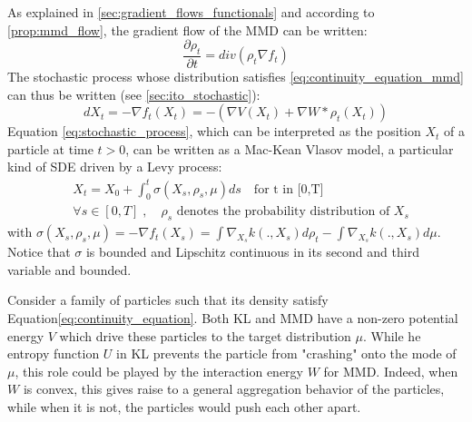 As explained in \cref{sec:gradient_flows_functionals} and according to \cref{prop:mmd_flow}, the gradient flow of the MMD can be written:
\begin{equation}\label{eq:continuity_equation_mmd}
\frac{\partial \rho_t}{\partial t}= div(\rho_t  \nabla f_t)
\end{equation}
The stochastic process whose distribution satisfies \eqref{eq:continuity_equation_mmd} can thus be written (see \cref{sec:ito_stochastic}):
\begin{equation}\label{eq:stochastic_process}
dX_t=-\nabla f_t(X_t) = - (\nabla V (X_t) + \nabla W * \rho_t(X_t))
\end{equation}
 Equation \eqref{eq:stochastic_process}, which can be interpreted as the position $X_t$ of a particle at time $t > 0$, can be written as a Mac-Kean Vlasov model, a particular kind of SDE driven by a Levy process:
\begin{align}\label{eq:theoretical_process}
&X_t=X_{0}+\int_{0}^t \sigma(X_s, \rho_s, \mu)ds \quad \text{for t in [0,T]}\\
&\forall s \in [0,T]\;,\quad \rho_s \text{ denotes the probability distribution of } X_s
\end{align}
with $\sigma(X_s, \rho_s, \mu)=-\nabla f_t(X_s)=\int \nabla_{X_s}k(.,X_s) d\rho_t -  \int \nabla_{X_s}k(.,X_s) d\mu$. Notice that $\sigma$ is bounded  and Lipschitz continuous in its second and third variable and bounded.

\begin{remark}
	Consider a family of particles such that its density satisfy Equation\eqref{eq:continuity_equation}. Both KL and MMD have a non-zero potential energy $V$ which drive these particles to the target distribution $\mu$. While he entropy function $U$ in KL prevents the particle from "crashing" onto the mode of $\mu$, this role could be played by the interaction energy $W$ for MMD. Indeed, when $W$ is convex, this gives raise to a general
	aggregation behavior of the particles, while when it is not, the particles would push each other apart.
\end{remark}


